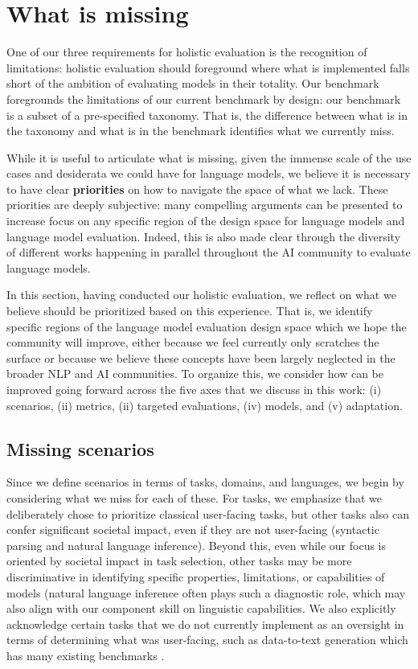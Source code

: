 \hypertarget{missing}{\section{What is missing}}
\label{sec:missing}
One of our three requirements for holistic evaluation is the recognition of limitations: holistic evaluation should foreground where what is implemented falls short of the ambition of evaluating models in their totality.
Our benchmark foregrounds the limitations of our current benchmark by design: our benchmark is a subset of a pre-specified taxonomy.
That is, the difference between what is in the taxonomy and what is in the benchmark identifies what we currently miss.

While it is useful to articulate what is missing, given the immense scale of the use cases and desiderata we could have for language models, we believe it is necessary to have clear \textbf{priorities} on how to navigate the space of what we lack.
These priorities are deeply subjective: many compelling arguments can be presented to increase focus on any specific region of the design space for language models and language model evaluation.
Indeed, this is also made clear through the diversity of different works happening in parallel throughout the AI community to evaluate language models.

In this section, having conducted our holistic evaluation, we reflect on what we believe should be prioritized based on this experience.
That is, we identify specific regions of the language model evaluation design space which we hope the community will improve, either because we feel \benchmarkname currently only scratches the surface or because we believe these concepts have been largely neglected in the broader NLP and AI communities. 
To organize this, we consider how \benchmarkname can be improved going forward across the five axes that we discuss in this work:
(i) scenarios,  
(ii) metrics,
(ii) targeted evaluations,
(iv) models, 
and (v) adaptation.

\subsection{Missing scenarios}
\label{sec:missing-scenarios}

Since we define scenarios in terms of tasks, domains, and languages, we begin by considering what we miss for each of these.
For tasks, we emphasize that we deliberately chose to prioritize classical user-facing tasks, but other tasks also can confer significant societal impact, even if they are not user-facing (\eg syntactic parsing and natural language inference). 
Beyond this, even while our focus is oriented by societal impact in task selection, other tasks may be more discriminative in identifying specific properties, limitations, or capabilities of models (\eg natural language inference often plays such a diagnostic role, which may also align with our component skill on linguistic capabilities.
We also explicitly acknowledge certain tasks that we do not currently implement as an oversight in terms of determining what was user-facing, such as data-to-text generation which has many existing benchmarks \citep[\eg][]{gardent2017webnlg, novikova2017e2e}.

